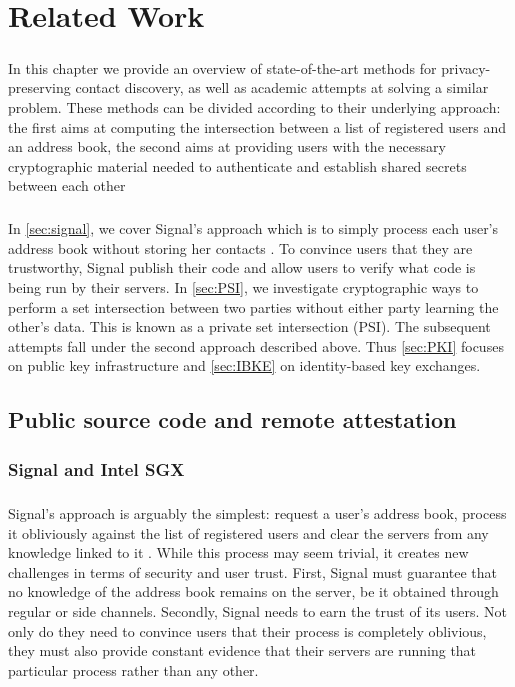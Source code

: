 \chapter{Related Work}
\label{chap:litreview}

\paragraph{} In this chapter we provide an overview of state-of-the-art methods for privacy-preserving contact discovery, as well as academic attempts at solving a similar problem. These methods can be divided according to their underlying approach: the first aims at computing the intersection between a list of registered users and an address book, the second aims at providing users with the necessary cryptographic material needed to authenticate and establish shared secrets between each other


\paragraph{} In \autoref{sec:signal}, we cover Signal's approach which is to simply process each user's address book without storing her contacts \cite{Signal:Tech}. To convince users that they are trustworthy, Signal publish their code and allow users to verify what code is being run by their servers. In \autoref{sec:PSI}, we investigate cryptographic ways to perform a set intersection between two parties without either party learning the other's data. This is known as a private set intersection (PSI). The subsequent attempts fall under the second approach described above. Thus \autoref{sec:PKI} focuses on public key infrastructure and \autoref{sec:IBKE} on identity-based key exchanges.

\section{Public source code and remote attestation}
\label{sec:signal}

\subsection{Signal and Intel SGX}

\paragraph{} Signal's approach is arguably the simplest: request a user's address book, process it obliviously against the list of registered users and clear the servers from any knowledge linked to it \cite{Signal:Tech}. While this process may seem trivial, it creates new challenges in terms of security and user trust. First, Signal must guarantee that no knowledge of the address book remains on the server, be it obtained through regular or side channels. Secondly, Signal needs to earn the trust of its users. Not only do they need to convince users that their process is completely oblivious, they must also provide constant evidence that their servers are running that particular process rather than any other.

